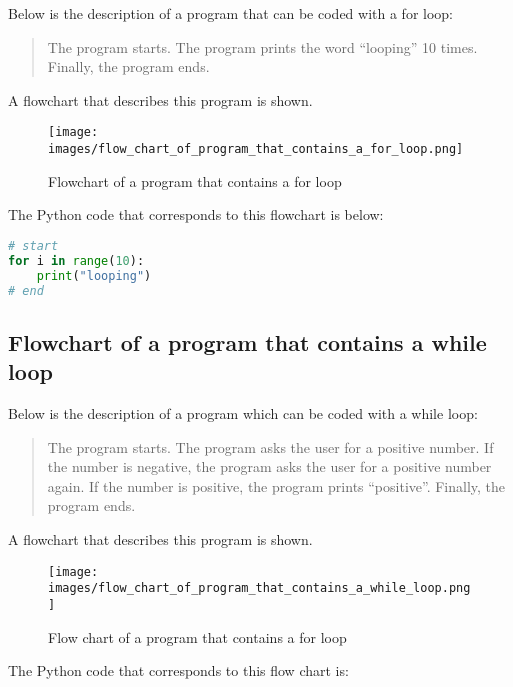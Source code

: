 \documentclass{book}
\makeatletter
\def\maxwidth{\ifdim\Gin@nat@width>\linewidth\linewidth
\else\Gin@nat@width\fi}
\let\Oldincludegraphics\includegraphics
\renewcommand{\includegraphics}[1]{\Oldincludegraphics[width=.8\maxwidth]{#1}}
\makeatother
\begin{document}
    
        Below is the description of a program that can be coded with a for loop:

\begin{quote}
The program starts. The program prints the word ``looping'' 10 times.
Finally, the program ends.
\end{quote}

A flowchart that describes this program is shown.

\begin{figure}
\centering
\texttt{[image: images/flow\_chart\_of\_program\_that\_contains\_a\_for\_loop.png]}
\caption{Flowchart of a program that contains a for loop}
\end{figure}

The Python code that corresponds to this flowchart is below:

\begin{lstlisting}[language=Python]
# start
for i in range(10):
    print("looping")
# end
\end{lstlisting}
    




    
        \hypertarget{flowchart-of-a-program-that-contains-a-while-loop}{%
\subsection{Flowchart of a program that contains a while
loop}\label{flowchart-of-a-program-that-contains-a-while-loop}}
    




    
        Below is the description of a program which can be coded with a while
loop:

\begin{quote}
The program starts. The program asks the user for a positive number. If
the number is negative, the program asks the user for a positive number
again. If the number is positive, the program prints ``positive''.
Finally, the program ends.
\end{quote}

A flowchart that describes this program is shown.

\begin{figure}
\centering
\texttt{[image: images/flow\_chart\_of\_program\_that\_contains\_a\_while\_loop.png]}
\caption{Flow chart of a program that contains a for loop}
\end{figure}

The Python code that corresponds to this flow chart is:
\end{document}
